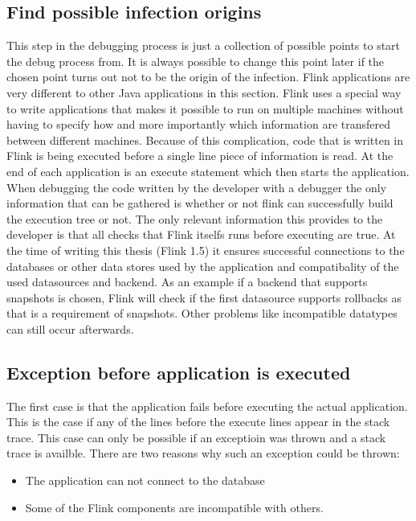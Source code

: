 \subsection{Find possible infection origins}
This step in the debugging process is just a collection of possible points to start the debug process from. It is always possible to change this point later if the chosen point turns out not to be the origin of the infection. Flink applications are very different to other Java applications in this section. Flink uses a special way to write applications that makes it possible to run on multiple machines without having to specify how and more importantly which information are transfered between different machines. Because of this complication, code that is written in Flink is being executed before a single line piece of information is read. At the end of each application is an execute statement which then starts the application. When debugging the code written by the developer with a debugger the only information that can be gathered is whether or not flink can successfully build the execution tree or not. The only relevant information this provides to the developer is that all checks that Flink itselfs runs before executing are true. At the time of writing this thesis (Flink 1.5) it ensures successful connections to the databases or other data stores used by the application and  compatibality of the used datasources and backend. As an example if a backend that supports snapshots is chosen, Flink will check if the first datasource supports rollbacks as that is a requirement of snapshots. Other problems like incompatible datatypes can still occur afterwards.


\subsection{Exception before application is executed}
The first case is that the application fails before executing the actual application. This is the case if any of the lines before the execute lines appear in the stack trace. This case can only be possible if an exceptioin was thrown and a stack trace is availble. There are two reasons why such an exception could be thrown:

\begin{itemize}
  \item The application can not connect to the database
  \item Some of the Flink components are incompatible with others.
\end{itemize}

